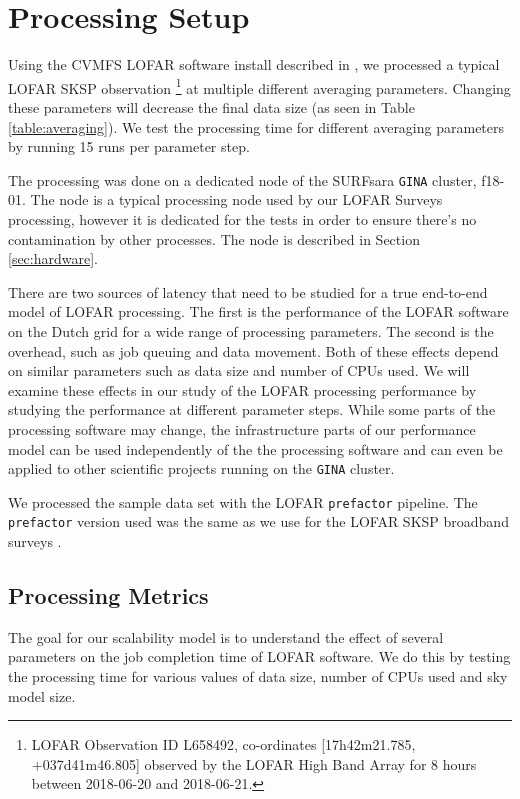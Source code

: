 \section{Processing Setup }\label{sec:methods}
Using the CVMFS LOFAR software install described in \citep{mechev17}, we processed a typical LOFAR SKSP observation \footnote{LOFAR Observation ID L658492, co-ordinates [17h42m21.785, +037d41m46.805] observed by the LOFAR High Band Array for 8 hours between 2018-06-20 and 2018-06-21. } at multiple different averaging parameters. Changing these parameters will decrease the final data size (as seen in Table \ref{table:averaging}). We test the processing time for different averaging parameters by running 15 runs per parameter step. 

The processing was done on a dedicated node of the SURFsara \texttt{GINA} cluster, f18-01. The node is a typical processing node used by our LOFAR Surveys processing, however it is dedicated for the tests in order to ensure there's no contamination by other processes. The node is described in Section \ref{sec:hardware}. 
     
There are two sources of latency that need to be studied for a true end-to-end model of LOFAR processing. The first is the performance of the LOFAR software on the Dutch grid for a wide range of processing parameters. The second is the overhead, such as job queuing and data movement. Both of these effects depend on similar parameters such as data size and number of CPUs used. We will examine these effects in our study of the LOFAR processing performance by studying the performance at different parameter steps. While some parts of the processing software may change, the infrastructure parts of our performance model can be used independently of the the processing software and can even be applied to other scientific projects running on the \texttt{GINA} cluster. 

We processed the sample data set with the LOFAR \texttt{prefactor} pipeline. The \texttt{prefactor} version used was the same as we use for the LOFAR SKSP broadband surveys \citep{prefactor_zenodo}. 

\subsection{Processing Metrics}
The goal for our scalability model is to understand the effect of several parameters on the job completion time of LOFAR software. We do this by testing the processing time for various values of data size, number of CPUs used and sky model size. 

